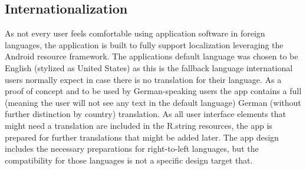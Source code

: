 \subsection{Internationalization}
As not every user feels comfortable using application software in foreign languages, the application is built to fully support localization leveraging the Android resource framework. The applications default language was chosen to be English (stylized as United States) as this is the fallback language international users normally expect in case there is no translation for their language. As a proof of concept and to be used by German-speaking users the app contains a full (meaning the user will not see any text in the default language) German (without further distinction by country) translation. As all user interface elements that might need a translation are included in the R.string resources, the app is prepared for further translations that might be added later. The app design includes the necessary preparations for right-to-left languages, but the compatibility for those languages is not a specific design target that. 


